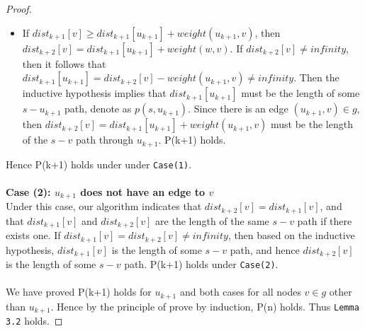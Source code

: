 \begin{proof}
\begin{itemize}
  \item If $dist_{k+1}[v] \geq dist_{k+1}[u_{k+1}] + weight(u_{k+1}, v)$, then $dist_{k+2}[v] = dist_{k+1}[u_{k+1}] + weight(w, v)$. If $dist_{k+2}[v] \neq infinity$, then it follows that $dist_{k+1}[u_{k+1}] = dist_{k+2}[v] - weight(u_{k+1}, v) \neq infinity$. Then the inductive hypothesis implies that $dist_{k+1}[u_{k+1}]$ must be the length of some $s-u_{k+1}$ path, denote as $p(s, u_{k+1})$. Since there is an edge $(u_{k+1}, v) \in g$, then $dist_{k+2}[v] = dist_{k+1}[u_{k+1}] + weight(u_{k+1}, v)$ must be the length of the $s-v$ path through $u_{k+1}$. P(k+1) holds. 
\end{itemize}
Hence P(k+1) holds under under \texttt{Case(1)}. 
\\\\
\textbf{Case (2): $u_{k+1}$ does not have an edge to $v$}
\tab\\
Under this case, our algorithm indicates that $dist_{k+2}[v] = dist_{k+1}[v]$, and that $dist_{k+1}[v]$ and $dist_{k+2}[v]$ are the length of the same $s-v$ path if there exists one. If $dist_{k+1}[v] = dist_{k+2}[v] \neq infinity$, then based on the inductive hypothesis, $dist_{k+1}[v]$ is the length of some $s-v$ path, and hence $dist_{k+2}[v]$ is the length of some $s-v$ path. P(k+1) holds under \texttt{Case(2)}. 
\\\\
We have proved P(k+1) holds for $u_{k+1}$ and both cases for all nodes $v \in g$ other than $u_{k+1}$. Hence by the principle of prove by induction, P(n) holds. Thus \texttt{\texttt{Lemma 3.2}} holds. 
\end{proof}
\tab\\ 